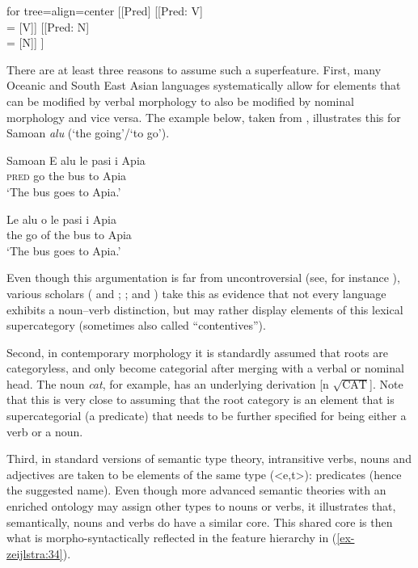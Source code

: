 \documentclass[output=paper
,modfonts
,nonflat]{langsci/langscibook}
\begin{document}
\ea \label{ex-zeijlstra:34}
			\begin{forest} for tree={align=center}	
				[{[}Pred{]}
				[{[}Pred: V{]}\\ {=} {[}V{]}]
				[{[}Pred: N{]}\\ {=} {[}N{]}]
				] 
		\end{forest} \z
\noindent There are at least three reasons to assume such a superfeature. First, many Oceanic and South East Asian languages systematically allow for elements that can be modified by verbal morphology to also be modified by nominal morphology and vice versa. The example below, taken from \citet{Don_VanLier2013}, illustrates this for Samoan \textit{alu} (‘the going’\slash‘to go’).

\begin{exe}
\ex	Samoan 
	\xlist
	\ex
	\gll E alu le pasi i Apia \\
	\textsc{pred} go the bus to Apia\\
	\glt   `The bus goes to Apia.'     
	
	\ex
	\gll Le alu o le pasi i Apia \\
	the  go of the bus  to Apia\\
	\glt   `The bus goes to Apia.'     
	\endxlist
	\end{exe}
Even though this argumentation is far from uncontroversial (see, for instance \citealt{Croft2005}), various scholars (\citealt{Hengeveld1992, Hengeveld2005} and \citealt{Mosel_Hovdhaugen1992}; \citealt{Gil2013}; and \citealt{Zeijlstra2017}) take this as evidence that not every language exhibits a noun–verb distinction, but may rather display elements of this lexical supercategory (sometimes also called ``contentives'').

Second, in contemporary morphology it is standardly assumed that roots are categoryless, and only become categorial after merging with a verbal or nominal head. The noun \textit{cat}, for example, has an underlying derivation [n $\sqrt{\text{CAT}}$]. Note that this is very close to assuming that the root category is an element that is supercategorial (a predicate) that needs to be further specified for being either a verb or a noun.

Third, in standard versions of semantic type theory, intransitive verbs, nouns and adjectives are taken to be elements of the same type (<e,t>): predicates (hence the suggested name). Even though more advanced semantic theories with an enriched ontology may assign other types to nouns or verbs, it illustrates that, semantically, nouns and verbs do have a similar core. This shared core is then what is morpho-syntactically reflected in the feature hierarchy in (\ref{ex-zeijlstra:34}).
\end{document}
